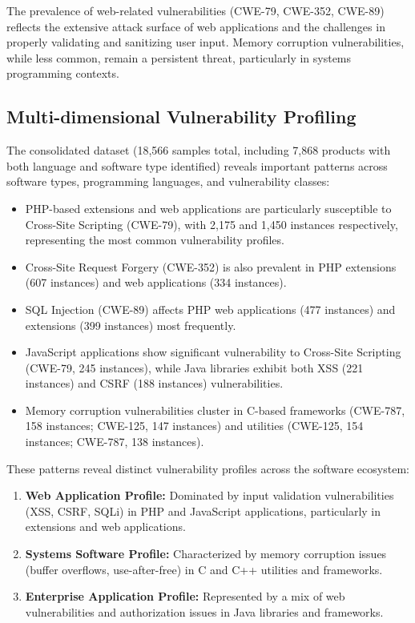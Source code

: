 The prevalence of web-related vulnerabilities (CWE-79, CWE-352, CWE-89) reflects the extensive attack surface of web applications and the challenges in properly validating and sanitizing user input. Memory corruption vulnerabilities, while less common, remain a persistent threat, particularly in systems programming contexts.

\subsection{Multi-dimensional Vulnerability Profiling}

The consolidated dataset (18,566 samples total, including 7,868 products with both language and software type identified) reveals important patterns across software types, programming languages, and vulnerability classes:

\begin{itemize}
    \item PHP-based extensions and web applications are particularly susceptible to Cross-Site Scripting (CWE-79), with 2,175 and 1,450 instances respectively, representing the most common vulnerability profiles.
    \item Cross-Site Request Forgery (CWE-352) is also prevalent in PHP extensions (607 instances) and web applications (334 instances).
    \item SQL Injection (CWE-89) affects PHP web applications (477 instances) and extensions (399 instances) most frequently.
    \item JavaScript applications show significant vulnerability to Cross-Site Scripting (CWE-79, 245 instances), while Java libraries exhibit both XSS (221 instances) and CSRF (188 instances) vulnerabilities.
    \item Memory corruption vulnerabilities cluster in C-based frameworks (CWE-787, 158 instances; CWE-125, 147 instances) and utilities (CWE-125, 154 instances; CWE-787, 138 instances).
\end{itemize}

These patterns reveal distinct vulnerability profiles across the software ecosystem:

\begin{enumerate}
    \item \textbf{Web Application Profile:} Dominated by input validation vulnerabilities (XSS, CSRF, SQLi) in PHP and JavaScript applications, particularly in extensions and web applications.
    \item \textbf{Systems Software Profile:} Characterized by memory corruption issues (buffer overflows, use-after-free) in C and C++ utilities and frameworks.
    \item \textbf{Enterprise Application Profile:} Represented by a mix of web vulnerabilities and authorization issues in Java libraries and frameworks.
\end{enumerate}

